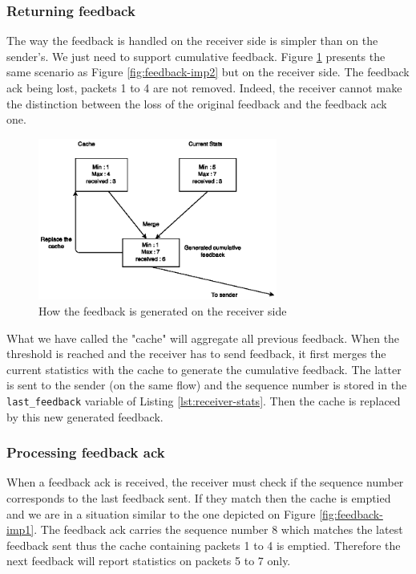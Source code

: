 \subsubsection{Returning feedback}

The way the feedback is handled on the receiver side is simpler than on the sender's. We just need to support cumulative feedback. Figure \ref{fig:feedback-imp3} presents the same scenario as Figure \ref{fig:feedback-imp2} but on the receiver side. The feedback ack being lost, packets 1 to 4 are not removed. Indeed, the receiver cannot make the distinction between the loss of the original feedback and the feedback ack one.

\begin{figure}[!ht]
\centering
\includegraphics[width=0.7\textwidth]{images/Feedback-implem3.eps}
\caption{How the feedback is generated on the receiver side}
\label{fig:feedback-imp3}
\end{figure}

What we have called the "cache" will aggregate all previous feedback. When the threshold is reached and the receiver has to send feedback, it first merges the current statistics with the cache to generate the cumulative feedback. The latter is sent to the sender (on the same flow) and the sequence number is stored in the \texttt{last\_feedback} variable of Listing \ref{lst:receiver-stats}. Then the cache is replaced by this new generated feedback.


\subsubsection{Processing feedback ack}

When a feedback ack is received, the receiver must check if the sequence number corresponds to the last feedback sent. If they match then the cache is emptied and we are in a situation similar to the one depicted on Figure \ref{fig:feedback-imp1}. The feedback ack carries the sequence number 8 which matches the latest feedback sent thus the cache containing packets 1 to 4 is emptied. Therefore the next feedback will report statistics on packets 5 to 7 only.

